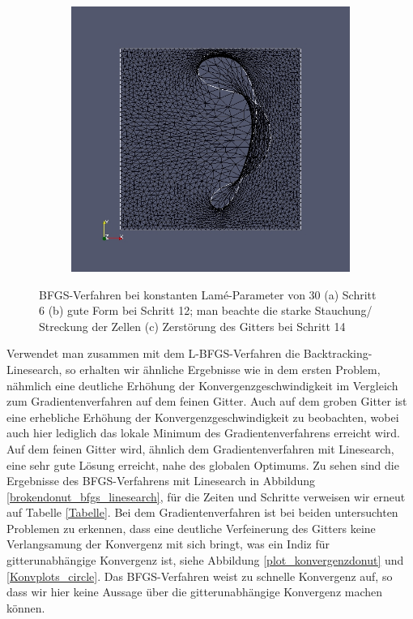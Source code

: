 \begin{figure}
\begin{subfigure}{0.315\textwidth}
	\caption{}	
	\end{subfigure}
	\begin{subfigure}{0.315\textwidth}
	\centering
	\includegraphics[scale=0.21]{pic_brokendonut_bfgs_konstlame_14.jpg}
	\caption{}	
	\end{subfigure}
\caption{BFGS-Verfahren bei konstanten Lamé-Parameter von 30 (a) Schritt 6 (b) gute Form bei Schritt 12; man beachte die starke Stauchung/ Streckung der Zellen (c) Zerstörung des Gitters bei Schritt 14}
\label{brokendonut_bfgs_konstlame}
\end{figure}

Verwendet man zusammen mit dem L-BFGS-Verfahren die Backtracking-Linesearch, so erhalten wir ähnliche Ergebnisse wie in dem ersten Problem, nähmlich eine deutliche Erhöhung der Konvergenzgeschwindigkeit im Vergleich zum Gradientenverfahren auf dem feinen Gitter. Auch auf dem groben Gitter ist eine erhebliche Erhöhung der Konvergenzgeschwindigkeit zu beobachten, wobei auch hier lediglich das lokale Minimum des Gradientenverfahrens erreicht wird. Auf dem feinen Gitter wird, ähnlich dem Gradientenverfahren mit Linesearch, eine sehr gute Lösung erreicht, nahe des globalen Optimums. Zu sehen sind die Ergebnisse des BFGS-Verfahrens mit Linesearch in Abbildung \ref{brokendonut_bfgs_linesearch}, für die Zeiten und Schritte verweisen wir erneut auf Tabelle \ref{Tabelle}. Bei dem Gradientenverfahren ist bei beiden untersuchten Problemen zu erkennen, dass eine deutliche Verfeinerung des Gitters keine Verlangsamung der Konvergenz mit sich bringt, was ein Indiz für gitterunabhängige Konvergenz ist, siehe Abbildung \ref{plot_konvergenzdonut} und \ref{Konvplots_circle}. Das BFGS-Verfahren weist zu schnelle Konvergenz auf, so dass wir hier keine Aussage über die gitterunabhängige Konvergenz machen können. 

